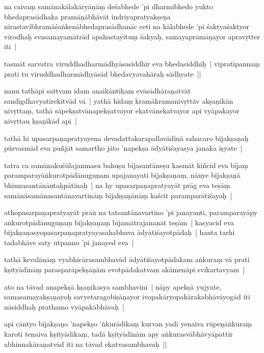 \documentclass[article,a4paper]{memoir}
\begin{document}
	  \pstart na caivaṃ samā\-nakā\-lakā\-ryā\-ṇā\-ṃ deśabhede 'pi dharmibhedo yukto bhedaprasā\-dhaka pramā\-ṇā\-bhā\-vā\-t indriyapratyakṣeṇa nirastavibhramā\-śaṅkenā\-bhedaprasā\-dhanā\-c ceti na kā\-labhede 'pi śaktyaśaktyor virodhaḥ svasamayamā\-trā\-d apahastayituṃ śakyaḥ, samayapramā\-ṇayor apravṛtter iti |
	\pend
      

	  \pstart tasmā\-t sarvatra viruddhadharmā\-dhyā\-sasiddhir eva bhedasiddhiḥ | vipratipannaṃ prati tu viruddhadharmā\-dhyā\-sā\-d bhedavyavahā\-raḥ sā\-dhyate ||
	\pend
      

	  \pstart nanu tathā\-pi sattvam idam anaikā\-ntikam evā\-sā\-dhā\-raṇatvā\-t sandigdhavyatirekitvā\-d vā\- | yathā\- hī\-daṃ kramā\-kramanivṛttā\-v akṣaṇikā\-n nivṛttaṃ, tathā\- sā\-pekṣatvā\-napekṣatvayor ekatvā\-nekatvayor api vyā\-pakayor nivṛttau kṣaṇikā\-d api | 
	\pend
      

	  \pstart tathā\- hi upasarpaṇapratyayena devadattakarapallavā\-dinā\- sahacaro bī\-jakṣaṇaḥ pū\-rvasmā\-d eva puñjā\-t samartho jā\-to 'napekṣa ā\-dyā\-tiśayasya janaka iṣyate | 
	\pend
      

	  \pstart tatra ca samā\-nakuśū\-lajanmasu bahuṣu bī\-jasantā\-neṣu kasmā\-t kiñcid eva bī\-jaṃ paramparayā\-ṅkurotpā\-dā\-nuguṇam upajanayati bī\-jakṣaṇaṃ, nā\-nye bī\-jakṣaṇā\- bhinnasantā\-nā\-ntaḥpā\-tinaḥ | na hy upasarpaṇapratyayā\-t prā\-g eva teṣā\-ṃ samā\-nā\-samā\-nasantā\-navartinā\-ṃ bī\-jakṣaṇā\-nā\-ṃ kaścit paramparā\-tiśayaḥ | 
	\pend
      

	  \pstart athopasarpaṇapratyayā\-t prā\-ṅ na tatsantā\-navartino 'pi janayanti, paramparayā\-py aṅkurotpā\-dā\-nuguṇaṃ bī\-jakṣaṇaṃ bī\-jamā\-trajananā\-t teṣā\-m | kasyacid eva bī\-jakṣaṇasyopasarpaṇapratyayasahabhuva ā\-dyā\-tiśayotpā\-daḥ | hanta tarhi tadabhā\-ve saty utpanno 'pi janayed eva | 
	\pend
      

	  \pstart tathā\- kevalā\-nā\-ṃ vyabhicā\-rasambhavā\-d ā\-dyā\-tiśayotpā\-dakam aṅkuraṃ vā\- prati kṣityā\-dī\-nā\-ṃ parasparā\-pekṣā\-ṇā\-m evotpā\-dakatvam akā\-menā\-pi svī\-kartavyam | 
	\pend
      

	  \pstart ato na tā\-vad anapekṣā\- kṣaṇikasya sambhavinī\- | nā\-py apekṣā\- yujyate, samasamayakṣaṇayoḥ savyetaragobiṣā\-ṇayor ivopakā\-ryopakā\-rakabhā\-vā\-yogā\-d iti nā\-siddhaḥ prathamo vyā\-pakā\-bhā\-vaḥ |
	\pend
      

	  \pstart api cā\-ntyo bī\-jakṣaṇo 'napekṣo 'ṅkurā\-dikaṃ kurvan yadi yenaiva rū\-peṇā\-ṅkuraṃ karoti tenaiva kṣityā\-dikaṃ, tadā\- kṣityā\-dī\-nā\-m apy aṅkurasvā\-bhā\-vyā\-pattir abhinnakā\-raṇatvā\-d iti na tā\-vad ekatvasambhavaḥ ||
	\pend
      
\end{document}
